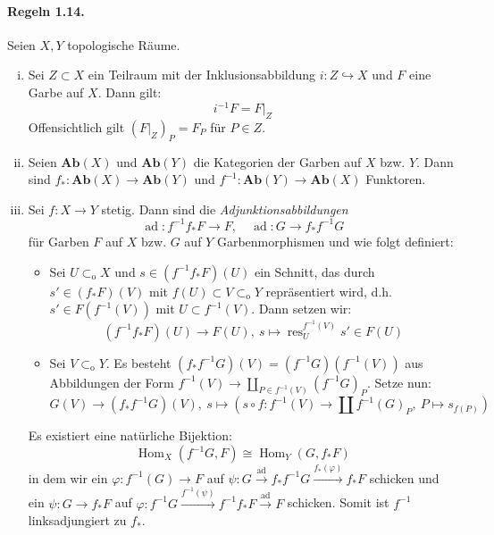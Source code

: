 \paragraph{Regeln 1.14.}\label{1.14} Seien $X,Y$ topologische Räume.
\begin{enumerate}[(i)]
\item Sei $Z\subset X$ ein Teilraum mit der Inklusionsabbildung $i:Z\hookrightarrow X$ und $F$ eine Garbe auf $X$. Dann gilt:
\[i^{-1}F = F|_Z \]
Offensichtlich gilt $(F|_Z)_P=F_P$ für $P\in Z$.
\item Seien $\mathbf{Ab}(X)$ und $\mathbf{Ab}(Y)$ die Kategorien der Garben auf $X$ bzw. $Y$. Dann sind $f_\ast:\mathbf{Ab}(X)\to\mathbf{Ab}(Y)$ und $f^{-1}:\mathbf{Ab}(Y)\to\mathbf{Ab}(X)$ Funktoren.
\item Sei $f:X\to Y$ stetig. Dann sind die \textit{Adjunktionsabbildungen}
\[\operatorname{ad}:f^{-1}f_\ast F\to F,\quad\operatorname{ad} :G\to f_\ast f^{-1}G \]
für Garben $F$ auf $X$ bzw. $G$ auf $Y$ Garbenmorphismen und wie folgt definiert:
\begin{itemize}
\item Sei $U\subset_\text{o}X$ und $s\in (f^{-1}f_\ast F)(U)$ ein Schnitt, das durch $s'\in (f_\ast F)(V)$ mit $f(U)\subset V\subset_\text{o}Y$ repräsentiert wird, d.h. $s'\in F(f^{-1}(V))$ mit $U\subset f^{-1}(V)$. Dann setzen wir:
\[(f^{-1}f_\ast F)(U)\to F(U),\ s\mapsto \operatorname{res}_U^{f^{-1}(V)}s'\in F(U)\]
\item Sei $V\subset_\text{o}Y$. Es besteht $(f_\ast f^{-1}G)(V)=(f^{-1}G)(f^{-1}(V))$ aus Abbildungen der Form $f^{-1}(V)\to\coprod_{P\in f^{-1}(V)}(f^{-1}G)_P$. Setze nun:
\[G(V)\to (f_\ast f^{-1}G)(V),\ s\mapsto (s\circ f: f^{-1}(V)\to\coprod  f^{-1}(G)_P,\ P\mapsto s_{f(P)}) \]
\end{itemize}
Es existiert eine natürliche Bijektion:
\[\operatorname{Hom}_X(f^{-1}G,F)\cong\operatorname{Hom}_Y(G,f_\ast F) \]
in dem wir ein $\varphi:f^{-1}(G)\to F$ auf $\psi: G\stackrel{\operatorname{ad}}{\longrightarrow} f_\ast f^{-1}G\stackrel{f_\ast(\varphi)}{\longrightarrow} f_\ast F$ schicken und ein $\psi:G\to f_\ast F$ auf $\varphi:f^{-1}G \stackrel{f^{-1}(\psi)}{\longrightarrow} f^{-1}f_\ast F\stackrel{\operatorname{ad}}{\longrightarrow}F$ schicken. Somit ist $f^{-1}$ linksadjungiert zu $f_\ast$.
\end{enumerate}

